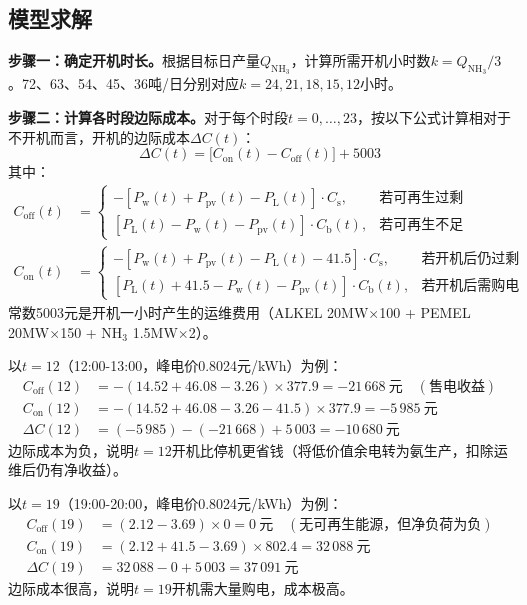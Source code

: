 \subsection{模型求解}

\textbf{步骤一：确定开机时长。}根据目标日产量$Q_{\mathrm{NH_3}}$，计算所需开机小时数$k = Q_{\mathrm{NH_3}}/3$。72、63、54、45、36吨/日分别对应$k=24,21,18,15,12$小时。

\textbf{步骤二：计算各时段边际成本。}对于每个时段$t=0,\ldots,23$，按以下公式计算相对于不开机而言，开机的边际成本$\Delta C(t)$：
\begin{equation}
\Delta C(t) = \bigl[ C_{\mathrm{on}}(t) - C_{\mathrm{off}}(t) \bigr] + 5003 \label{eq:q2_marginal}
\end{equation}
其中：
\begin{align*}
C_{\mathrm{off}}(t) &=
\begin{cases}
- [P_{\mathrm{w}}(t)+P_{\mathrm{pv}}(t)-P_{\mathrm{L}}(t)] \cdot C_{\mathrm{s}}, & \text{若可再生过剩}\\
[P_{\mathrm{L}}(t)-P_{\mathrm{w}}(t)-P_{\mathrm{pv}}(t)] \cdot C_{\mathrm{b}}(t), & \text{若可再生不足}
\end{cases} \\
C_{\mathrm{on}}(t) &=
\begin{cases}
- [P_{\mathrm{w}}(t)+P_{\mathrm{pv}}(t)-P_{\mathrm{L}}(t)-41.5] \cdot C_{\mathrm{s}}, & \text{若开机后仍过剩}\\
[P_{\mathrm{L}}(t)+41.5-P_{\mathrm{w}}(t)-P_{\mathrm{pv}}(t)] \cdot C_{\mathrm{b}}(t), & \text{若开机后需购电}
\end{cases}
\end{align*}
常数5003元是开机一小时产生的运维费用（ALKEL 20MW$\times$100 + PEMEL 20MW$\times$150 + NH$_3$ 1.5MW$\times$2）。

以$t=12$（12:00-13:00，峰电价0.8024元/kWh）为例：
\begin{align*}
C_{\mathrm{off}}(12) &= -(14.52+46.08-3.26)\times 377.9 = -21\,668\ \text{元} \quad (\text{售电收益})\\
C_{\mathrm{on}}(12) &= -(14.52+46.08-3.26-41.5)\times 377.9 = -5\,985\ \text{元}\\
\Delta C(12) &= (-5\,985) - (-21\,668) + 5\,003 = -10\,680\ \text{元}
\end{align*}
边际成本为负，说明$t=12$开机比停机更省钱（将低价值余电转为氨生产，扣除运维后仍有净收益）。

以$t=19$（19:00-20:00，峰电价0.8024元/kWh）为例：
\begin{align*}
C_{\mathrm{off}}(19) &= (2.12-3.69)\times 0 = 0\ \text{元} \quad (\text{无可再生能源，但净负荷为负})\\
C_{\mathrm{on}}(19) &= (2.12+41.5-3.69)\times 802.4 = 32\,088\ \text{元}\\
\Delta C(19) &= 32\,088 - 0 + 5\,003 = 37\,091\ \text{元}
\end{align*}
边际成本很高，说明$t=19$开机需大量购电，成本极高。

